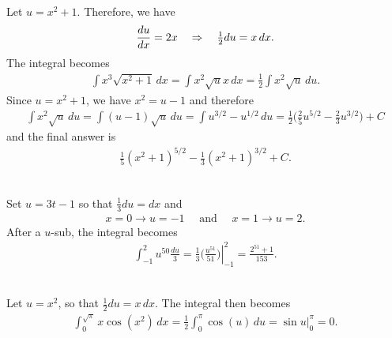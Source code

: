 	\spc
	
	\\
	Let $u = x^2 + 1$. Therefore, we have
		\begin{align*}
		\frac{du}{dx} = 2x \quad \Rightarrow \quad \tfrac{1}{2} du = x \, dx .
		\end{align*}	
	The integral becomes
		\begin{align*}
		\int x^3 \sqrt{x^2 + 1} \, dx = \int x^2 \sqrt{u} x \, dx = \tfrac{1}{2}\int x^2 \sqrt{u} \, du .
		\end{align*}	
	Since $u = x^2 + 1$, we have $x^2 = u - 1$ and therefore
		\begin{align*}
		\int x^2 \sqrt{u} \, du = \int (u - 1) \sqrt{u} \, du = \int u^{3/2} - u^{1/2} \, du = \frac{1}{2} \big( \frac{2}{5} u^{5/2} - \frac{2}{3} u^{3/2} \big) + C
		\end{align*}					
	and the final answer is
		\begin{align*}
		\frac{1}{5} (x^2 + 1)^{5/2} - \frac{1}{3} (x^2 + 1)^{3/2} + C .
		\end{align*}
		
	\spc
	
	\\
	Set $u = 3t - 1$ so that $\tfrac{1}{3} du = dx$ and
		\begin{align*}
		x = 0  \rightarrow u = -1 \quad \text{ and } \quad x = 1 \rightarrow u = 2 .
		\end{align*}
	After a $u$-sub, the integral becomes
		\begin{align*}
		\int_{-1}^2 u^{50} \frac{du}{3} = \frac{1}{3} \left. \big( \frac{u^{51}}{51} \big) \right|_{-1}^2 =  \frac{2^{51} + 1}{153} .
		\end{align*}
		
	\spc
	
	\\
	Let $u = x^2$, so that $\tfrac{1}{2} du = x \, dx$. The integral then becomes
		\begin{align*}
		\int_0^{\sqrt{\pi}} x \cos (x^2 ) \, dx = \frac{1}{2} \int_0^{\pi} \cos (u) \, du = \left. \sin u \right|_0^\pi = 0 .
		\end{align*}
		
	\spc
	
